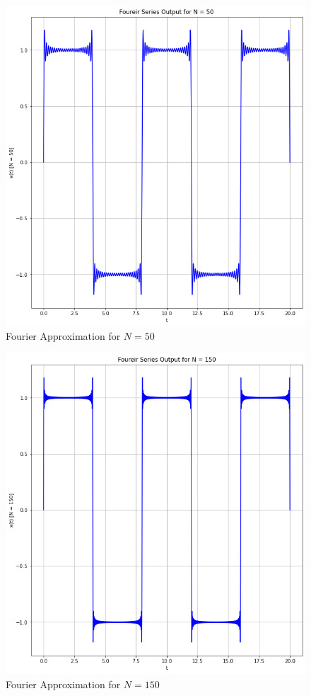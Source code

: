 \documentclass[12pt]{report}
\begin{document}
\begin{figure}[h!]
  \centering
  \includegraphics[scale=.5]{p1t2-3.png}
  \caption{Fourier Approximation for $N = 50$}
  \label{fig: p1t2-3}
\end{figure}
\begin{figure}[h!]
  \centering
  \includegraphics[scale=.5]{p1t2-4.png}
  \caption{Fourier Approximation for $N = 150$}
  \label{fig: p1t2-4}
\end{figure}
\end{document}
